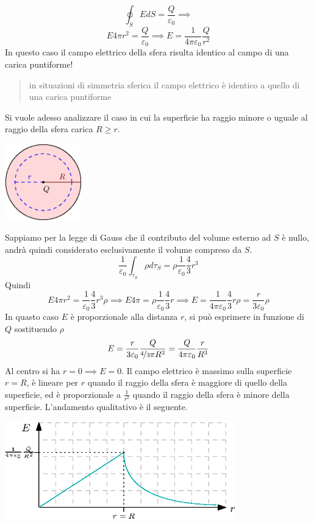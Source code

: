 \documentclass[10pt, letterpaper]{report}
\begin{document}
$$ \oint_S EdS=\frac{Q}{\varepsilon_0}\implies$$
$$ E4\pi r^2=\frac{Q}{\varepsilon_0}\implies 
E = \frac{1}{4\pi\varepsilon_0}\frac{Q}{ r^2}$$
In questo caso il campo elettrico della sfera risulta identico al campo di una carica puntiforme!
\begin{quote}
    in situazioni di simmetria sferica il campo elettrico è identico a quello di una carica puntiforme
\end{quote}
Si vuole adesso analizzare il caso in cui la superficie ha raggio minore o uguale al raggio della sfera carica $R\ge r$.
\begin{center}
    \includegraphics[width=0.25\textwidth]{images/sferaCarica2.eps}
\end{center}
Sappiamo per la legge di Gauss che il contributo del volume esterno ad $S$ è nullo, andrà quindi considerato esclusivamente il volume compreso da $S$. 
$$ \frac{1}{\varepsilon_0}\int_{\tau_S}\rho d\tau_S=\rho\frac{1}{\varepsilon_0}\frac{4}{3}r^3$$
Quindi 
$$ E4\pi r^2=\frac{1}{\varepsilon_0}\frac{4}{3}r^3\rho\implies 
E4\pi=\rho\frac{1}{\varepsilon_0}\frac{4}{3}r \implies E = \frac{1}{4\pi\varepsilon_0}\frac{4}{3}r\rho=\frac{r}{3\varepsilon_0}\rho$$
In quasto caso $E$ è proporzionale alla distanza $r$, si può esprimere in funzione di $Q$ sostituendo $\rho$
$$ E=\frac{r}{3\varepsilon_0}\frac{Q}{\nicefrac{4}{3}\pi R^3}=\frac{Q}{4\pi\varepsilon_0}\frac{r}{R^3}$$
Al centro si ha $r=0\implies E=0$. Il campo elettrico è massimo sulla superficie $r=R$, è lineare per $r$ quando il raggio della sfera è maggiore di quello della superficie, ed è proporzionale a $\frac{1}{r^2}$ quando il raggio della sfera è minore della superficie. L'andamento qualitativo è il seguente.
\begin{center}
    \includegraphics[width=0.75\textwidth]{images/campoSfera.eps}
\end{center}
\end{document}
